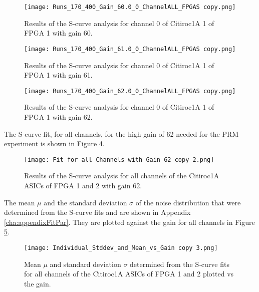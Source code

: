     \begin{figure}[H]
        \centering
        \texttt{[image: Runs\_170\_400\_Gain\_60.0\_0\_ChannelALL\_FPGAS copy.png]}
        \caption{Results of the S-curve analysis for channel 0 of Citiroc1A 1 of FPGA 1 with gain 60.}
        \label{fig:S_curve_60}
    \end{figure}
    \begin{figure}[H]
        \centering
        \texttt{[image: Runs\_170\_400\_Gain\_61.0\_0\_ChannelALL\_FPGAS copy.png]}
        \caption{Results of the S-curve analysis for channel 0 of Citiroc1A 1 of FPGA 1 with gain 61.}
        \label{fig:S_curve_61}
    \end{figure}
    \begin{figure}[H]
        \centering
        \texttt{[image: Runs\_170\_400\_Gain\_62.0\_0\_ChannelALL\_FPGAS copy.png]}
        \caption{Results of the S-curve analysis for channel 0 of Citiroc1A 1 of FPGA 1 with gain 62.}
        \label{fig:S_curve_62}
    \end{figure}
    The S-curve fit, for all channels, for the high gain of 62 needed for the PRM experiment is shown in Figure \ref{fig:S_curve_62_ALL}. 
    
    \begin{figure}[H]
        \centering
        \texttt{[image: Fit for all Channels with Gain 62 copy 2.png]}
        \caption{Results of the S-curve analysis for all channels of the Citiroc1A ASICs of FPGA 1 and 2 with gain 62.}
        \label{fig:S_curve_62_ALL}
    \end{figure}
    The mean $\mu$ and the standard deviation $\sigma$ of the noise distribution that were determined from the S-curve fits and are shown in Appendix \ref{cha:appendixFitPar}.
    They are plotted against the gain for all channels in Figure \ref{fig:Mean vs gain}.
    \begin{figure}[H]
        \centering
        \texttt{[image: Individual\_Stddev\_and\_Mean\_vs\_Gain copy 3.png]}
        \caption{Mean $\mu$ and standard deviation $\sigma$ determined from the S-curve fits for all channels of the Citiroc1A ASICs of FPGA 1 and 2 plotted vs the gain.}
        \label{fig:Mean vs gain}
    \end{figure}
    
